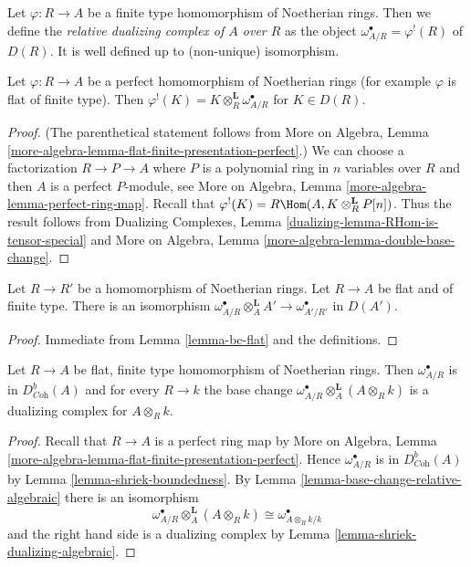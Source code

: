 \noindent
Let $\varphi : R \to A$ be a finite type homomorphism of
Noetherian rings. Then we define the {\it relative dualizing
complex of $A$ over $R$} as the object
$\omega_{A/R}^\bullet = \varphi^!(R)$ of $D(R)$.
It is well defined up to (non-unique) isomorphism.

\begin{lemma}
\label{lemma-upper-shriek-is-tensor-functor}
Let $\varphi : R \to A$ be a perfect homomorphism of Noetherian rings
(for example $\varphi$ is flat of finite type).
Then $\varphi^!(K) = K \otimes_R^\mathbf{L} \omega_{A/R}^\bullet$
for $K \in D(R)$.
\end{lemma}

\begin{proof}
(The parenthetical statement follows from
More on Algebra, Lemma
\ref{more-algebra-lemma-flat-finite-presentation-perfect}.)
We can choose a factorization $R \to P \to A$ where $P$ is a polynomial
ring in $n$ variables over $R$ and then $A$ is a perfect $P$-module, see
More on Algebra, Lemma \ref{more-algebra-lemma-perfect-ring-map}.
Recall that $\varphi^!(K) = R\Hom(A, K \otimes_R^\mathbf{L} P[n])$.
Thus the result follows from Dualizing Complexes, Lemma
\ref{dualizing-lemma-RHom-is-tensor-special}
and More on Algebra, Lemma \ref{more-algebra-lemma-double-base-change}.
\end{proof}

\begin{lemma}
\label{lemma-base-change-relative-algebraic}
Let $R \to R'$ be a homomorphism of Noetherian rings.
Let $R \to A$ be flat and of finite type. There is an isomorphism
$\omega_{A/R}^\bullet \otimes_A^\mathbf{L} A' \to \omega^\bullet_{A'/R'}$
in $D(A')$.
\end{lemma}

\begin{proof}
Immediate from Lemma \ref{lemma-bc-flat} and the definitions.
\end{proof}

\begin{lemma}
\label{lemma-relative-dualizing-algebraic}
Let $R \to A$ be flat, finite type homomorphism of Noetherian rings.
Then $\omega_{A/R}^\bullet$ is in $D^b_{\textit{Coh}}(A)$
and for every $R \to k$ the base change
$\omega_{A/R}^\bullet \otimes_A^\mathbf{L} (A \otimes_R k)$
is a dualizing complex for $A \otimes_R k$.
\end{lemma}

\begin{proof}
Recall that $R \to A$ is a perfect ring map by More on Algebra, Lemma
\ref{more-algebra-lemma-flat-finite-presentation-perfect}.
Hence $\omega_{A/R}^\bullet$ is in $D^b_{\textit{Coh}}(A)$
by Lemma \ref{lemma-shriek-boundedness}.
By Lemma \ref{lemma-base-change-relative-algebraic}
there is an isomorphism
$$
\omega_{A/R}^\bullet \otimes_A^\mathbf{L} (A \otimes_R k) \cong
\omega^\bullet_{A \otimes_R k/k}
$$
and the right hand side is a dualizing complex by
Lemma \ref{lemma-shriek-dualizing-algebraic}.
\end{proof}







